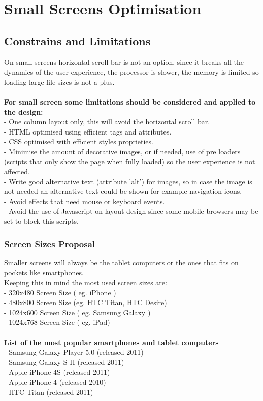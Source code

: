 \newpage
\section{Small Screens Optimisation}

\subsection{Constrains and Limitations}
On small screens horizontal scroll bar is not an option, since it breaks all the dynamics of the user experience, the processor is slower, the memory is limited so loading large file sizes is not a plus.\\
\\
\noindent \textbf{For small screen some limitations should be considered and applied to the design:}\\
- One column layout only, this will avoid the horizontal scroll bar.\\
- HTML optimised using efficient tags and attributes.\\
- CSS optimised with efficient styles proprieties.\\
- Minimise the amount of decorative images, or if needed, use of pre loaders (scripts that only show the page when fully loaded) so the user experience is not affected.\\
- Write good alternative text (attribute 'alt')  for images, so in case the image is not needed an alternative text could be shown for example navigation icons.\\
- Avoid effects that need mouse or keyboard events.\\
- Avoid the use of Javascript on layout design since some mobile browsers may be set to block this scripts.

\subsubsection{Screen Sizes Proposal}
Smaller screens will always be the tablet computers or the ones that fits on pockets like smartphones.\\
Keeping this in mind the most used screen sizes are:\\
- 320x480 Screen Size ( eg. iPhone )\\ 	%
- 480x800 Screen Size (eg. HTC Titan, HTC Desire)\\ %
- 1024x600 Screen Size ( eg. Samsung Galaxy )\\
- 1024x768 Screen Size ( eg. iPad)\\
\\
\noindent \textbf{List of the most popular smartphones and tablet computers}\\
- Samsung Galaxy Player 5.0 (released 2011)\\
- Samsung Galaxy S II (released 2011)\\
- Apple iPhone 4S (released 2011)\\
- Apple iPhone 4 (released 2010)\\
- HTC Titan (released 2011)\\


